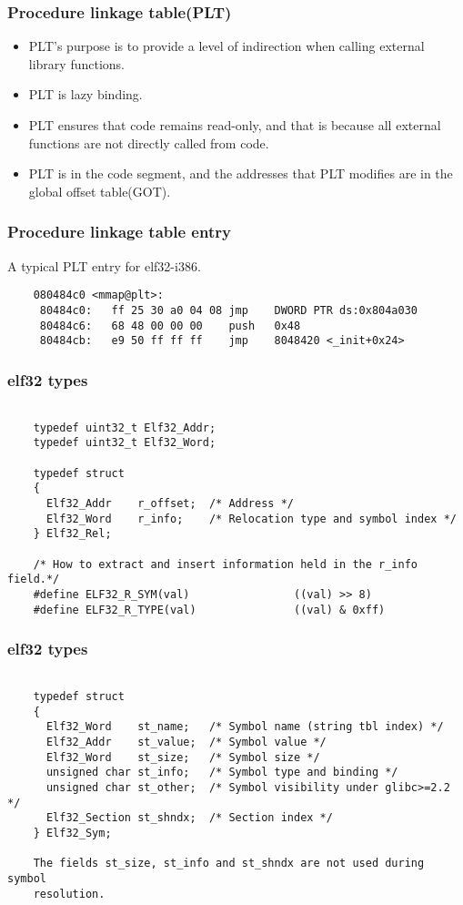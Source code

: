 \documentclass[10pt]{beamer}
\begin{document}
\begin{frame}[fragile]
\frametitle{Procedure linkage table(PLT)}

 \begin{itemize}
    \item PLT's purpose is to provide a level of indirection when calling external library functions.
    \item PLT is lazy binding.
    \item PLT ensures that code remains read-only, and that is because all external functions are not directly called from code.
    \item PLT is in the code segment, and the addresses that PLT modifies are in the global offset table(GOT).
  \end{itemize}

\end{frame}

\begin{frame}[fragile]
\frametitle{Procedure linkage table entry}
A typical PLT entry for elf32-i386.
	\begin{verbatim}
	080484c0 <mmap@plt>:
	 80484c0:	ff 25 30 a0 04 08 jmp    DWORD PTR ds:0x804a030
	 80484c6:	68 48 00 00 00    push   0x48
	 80484cb:	e9 50 ff ff ff    jmp    8048420 <_init+0x24>
	\end{verbatim}


\end{frame}

\begin{frame}[fragile]
\frametitle{elf32 types}

	\footnotesize 
	\begin{verbatim}
	
	typedef uint32_t Elf32_Addr;
	typedef uint32_t Elf32_Word;
	
	typedef struct
	{
	  Elf32_Addr    r_offset;  /* Address */
	  Elf32_Word    r_info;    /* Relocation type and symbol index */
	} Elf32_Rel;
	
	/* How to extract and insert information held in the r_info field.*/
	#define ELF32_R_SYM(val)                ((val) >> 8)
	#define ELF32_R_TYPE(val)               ((val) & 0xff)
	\end{verbatim}
	\normalsize

\end{frame}

\begin{frame}[fragile]
\frametitle{elf32 types}

	\footnotesize 
	\begin{verbatim}
	
	typedef struct
	{
	  Elf32_Word    st_name;   /* Symbol name (string tbl index) */
	  Elf32_Addr    st_value;  /* Symbol value */
	  Elf32_Word    st_size;   /* Symbol size */
	  unsigned char st_info;   /* Symbol type and binding */
	  unsigned char st_other;  /* Symbol visibility under glibc>=2.2 */
	  Elf32_Section st_shndx;  /* Section index */
	} Elf32_Sym;
	
	The fields st_size, st_info and st_shndx are not used during symbol
	resolution.
	\end{verbatim}
	\normalsize

\end{frame}
\end{document}
